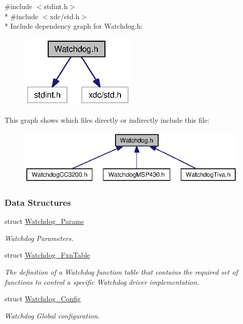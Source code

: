 {\ttfamily \#include $<$stdint.\-h$>$}\\*
{\ttfamily \#include $<$xdc/std.\-h$>$}\\*
Include dependency graph for Watchdog.\-h\-:
\nopagebreak
\begin{figure}[H]
\begin{center}
\leavevmode
\includegraphics[width=159pt]{_watchdog_8h__incl}
\end{center}
\end{figure}
This graph shows which files directly or indirectly include this file\-:
\nopagebreak
\begin{figure}[H]
\begin{center}
\leavevmode
\includegraphics[width=350pt]{_watchdog_8h__dep__incl}
\end{center}
\end{figure}
\subsubsection*{Data Structures}
\begin{DoxyCompactItemize}
\item 
struct \hyperlink{struct_watchdog___params}{Watchdog\-\_\-\-Params}
\begin{DoxyCompactList}\small\item\em Watchdog Parameters. \end{DoxyCompactList}\item 
struct \hyperlink{struct_watchdog___fxn_table}{Watchdog\-\_\-\-Fxn\-Table}
\begin{DoxyCompactList}\small\item\em The definition of a Watchdog function table that contains the required set of functions to control a specific Watchdog driver implementation. \end{DoxyCompactList}\item 
struct \hyperlink{struct_watchdog___config}{Watchdog\-\_\-\-Config}
\begin{DoxyCompactList}\small\item\em Watchdog Global configuration. \end{DoxyCompactList}\end{DoxyCompactItemize}
